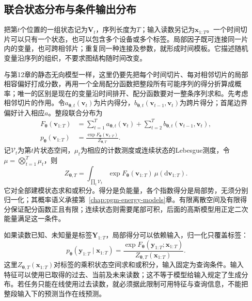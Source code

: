 \subsection{联合状态分布与条件输出分布}
\label{sec:pgm-dynamic-undirected-distributions}

把第$t$个位置的一组状态记为$\bm V_t$，序列长度为$T$；输入读数另记为$\bm x_{1:T}$。一个时间切片可以只有一个状态，也可以包含多个设备或多个标签。局部因子既可连接同一片内的变量，也可跨相邻片；重复同一种连接及参数，就形成时间模板。它描述随机变量沿序列的组织，不要求图结构随时间改变。

与第12章的静态无向模型一样，这里仍要先把每个时间切片、每对相邻切片的局部相容偏好打成分数，再用一个全局配分函数把整段所有可能序列的得分折算成概率；唯一的区别是现在的变量沿时间排开、配分函数要对一整条序列求和。先考虑相邻切片的作用。令$a_{\bm\theta,t}(\bm v_t)$为片内得分，$b_{\bm\theta,t}(\bm v_{t-1},\bm v_t)$为跨片得分；首尾边界偏好计入相应$a$。整段联合分布为
\begin{equation}
  \begin{aligned}
    F_{\bm\theta}(\bm v_{1:T})
      &=\sum_{t=1}^T a_{\bm\theta,t}(\bm v_t)
          +\sum_{t=2}^T b_{\bm\theta,t}
                         (\bm v_{t-1},\bm v_t),\\
    p_{\bm\theta}(\bm v_{1:T})
      &=\frac{\exp F_{\bm\theta}(\bm v_{1:T})}
                    {Z_{\bm\theta,T}}.
  \end{aligned}
  \label{eq:pgm-dynamic-undirected-joint}
\end{equation}
记$\mathcal V_t$为第$t$片状态空间，$\mu_t$为相应的计数测度或连续状态的Lebesgue测度，令$\mu=\bigotimes_{t=1}^T\mu_t$，则
\[
  Z_{\bm\theta,T}=\int_{\prod_t\mathcal V_t}
     \exp F_{\bm\theta}(\bm v_{1:T})\,\mu(\mathrm d\bm v_{1:T}).
\]
它对全部建模状态求和或积分。得分是负能量，各个指数得分是局部势，无须分别归一化；其概率语义承接第~\ref{chap:pgm-energy-models}章。有限离散空间及有限得分保证配分函数正且有限；连续状态则需要尾部可积，后面的高斯模型用正定二次能量满足这一条件。

如果读数已知、未知量是标签$\bm Y_{1:T}$，局部得分可以依赖输入，归一化只覆盖标签：
\begin{equation}
  p_{\bm\theta}(\bm y_{1:T}\mid\bm x_{1:T})
    =\frac{\exp F_{\bm\theta}(\bm y_{1:T};\bm x_{1:T})}
                  {Z_{\bm\theta,T}(\bm x_{1:T})}.
  \label{eq:pgm-dynamic-undirected-conditional}
\end{equation}
这里$Z_{\bm\theta,T}(\bm x_{1:T})$对标签的乘积状态空间求和或积分，输入固定为查询条件。输入特征可以使用已取得的过去、当前及未来读数；这不等于模型给输入规定了生成分布。若任务只能在线使用过去读数，就必须据此限制可用特征与查询信息，不能把整段输入下的预测当作在线预测。

